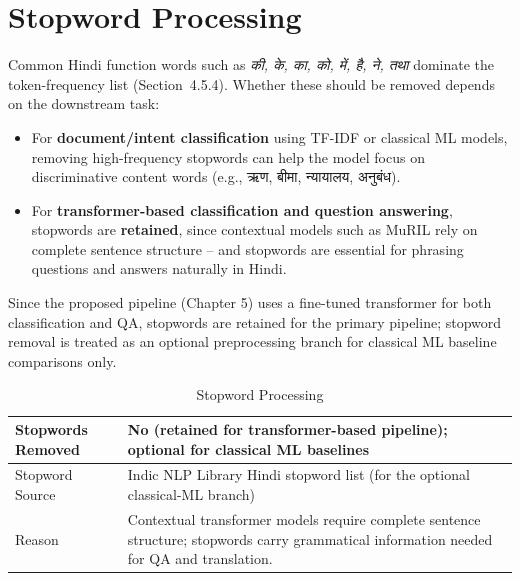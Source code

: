 
\section{Stopword Processing}

Common Hindi function words such as \textit{की, के, का, को, में, है, ने, तथा} dominate the token-frequency list (Section~4.5.4). Whether these should be removed depends on the downstream task:

\begin{itemize}
\item For \textbf{document/intent classification} using TF-IDF or classical ML models, removing high-frequency stopwords can help the model focus on discriminative content words (e.g., ऋण, बीमा, न्यायालय, अनुबंध).
\item For \textbf{transformer-based classification and question answering}, stopwords are \textbf{retained}, since contextual models such as MuRIL rely on complete sentence structure -- and stopwords are essential for phrasing questions and answers naturally in Hindi.
\end{itemize}

Since the proposed pipeline (Chapter 5) uses a fine-tuned transformer for both classification and QA, stopwords are retained for the primary pipeline; stopword removal is treated as an optional preprocessing branch for classical ML baseline comparisons only.

\renewcommand{\arraystretch}{1.5}

\begin{table}[H]
\centering
\caption{Stopword Processing}

\begin{tabular}{|p{6cm}|p{8cm}|}

\hline

Stopwords Removed &
No (retained for transformer-based pipeline); optional for classical ML baselines
\\

\hline

Stopword Source &
Indic NLP Library Hindi stopword list (for the optional classical-ML branch)
\\

\hline

Reason &
Contextual transformer models require complete sentence structure; stopwords carry grammatical information needed for QA and translation.
\\

\hline

\end{tabular}

\end{table}

